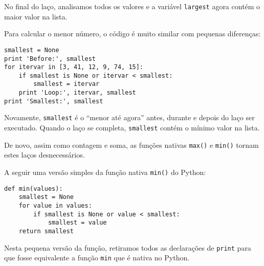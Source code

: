 
No final do laço, analisamos todos os valores e a variável {\tt largest}
agora contém o maior valor na lista.


Para calcular o menor número, o código é muito similar com pequenas
diferenças:

\beforeverb
\begin{verbatim}
smallest = None
print 'Before:', smallest
for itervar in [3, 41, 12, 9, 74, 15]:
    if smallest is None or itervar < smallest:
        smallest = itervar
    print 'Loop:', itervar, smallest
print 'Smallest:', smallest
\end{verbatim}
\afterverb
%

Novamente, {\tt smallest} é o ``menor até agora'' antes, durante e depois do
laço ser executado. Quando o laço se completa, {\tt smallest} contém o mínimo
valor na lista.


De novo, assim como contagem e soma, as funções nativas {\tt max()} e
{\tt min()} tornam estes laços desnecessários.


A seguir uma versão simples da função nativa {\tt min()} do Python:

\beforeverb
\begin{verbatim}
def min(values):
    smallest = None
    for value in values:
        if smallest is None or value < smallest:
            smallest = value
    return smallest
\end{verbatim}
\afterverb
%

%
Nesta pequena versão da função, retiramos todos as declarações de {\tt print}
para que fosse equivalente a função {\tt min} que é nativa no Python.

